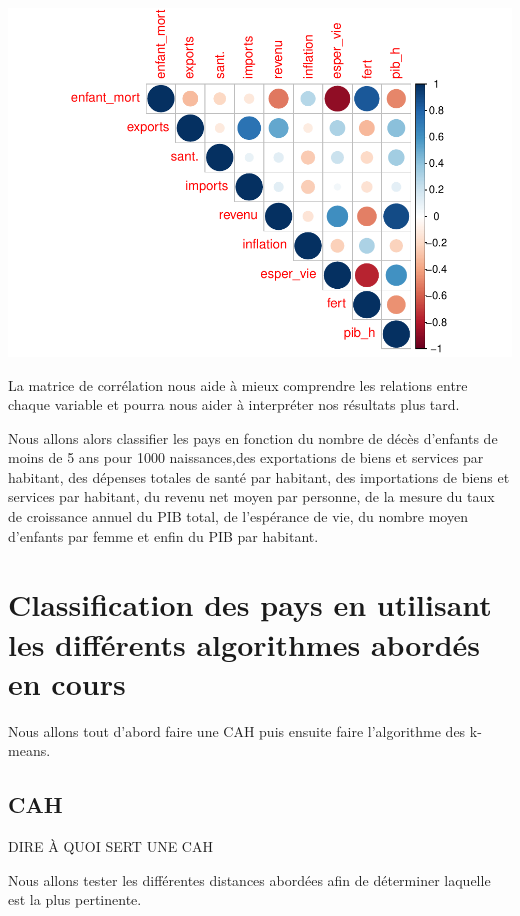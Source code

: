 \documentclass[
]{article}
\begin{document}
\includegraphics{Projet_files/figure-latex/unnamed-chunk-10-1.pdf}

La matrice de corrélation nous aide à mieux comprendre les relations
entre chaque variable et pourra nous aider à interpréter nos résultats
plus tard.

Nous allons alors classifier les pays en fonction du nombre de décès
d'enfants de moins de 5 ans pour 1000 naissances,des exportations de
biens et services par habitant, des dépenses totales de santé par
habitant, des importations de biens et services par habitant, du revenu
net moyen par personne, de la mesure du taux de croissance annuel du PIB
total, de l'espérance de vie, du nombre moyen d'enfants par femme et
enfin du PIB par habitant.

\hypertarget{classification-des-pays-en-utilisant-les-diffuxe9rents-algorithmes-aborduxe9s-en-cours}{%
\section{Classification des pays en utilisant les différents algorithmes
abordés en
cours}\label{classification-des-pays-en-utilisant-les-diffuxe9rents-algorithmes-aborduxe9s-en-cours}}

Nous allons tout d'abord faire une CAH puis ensuite faire l'algorithme
des k-means.

\hypertarget{cah}{%
\subsection{CAH}\label{cah}}

DIRE À QUOI SERT UNE CAH

Nous allons tester les différentes distances abordées afin de déterminer
laquelle est la plus pertinente.
\end{document}
